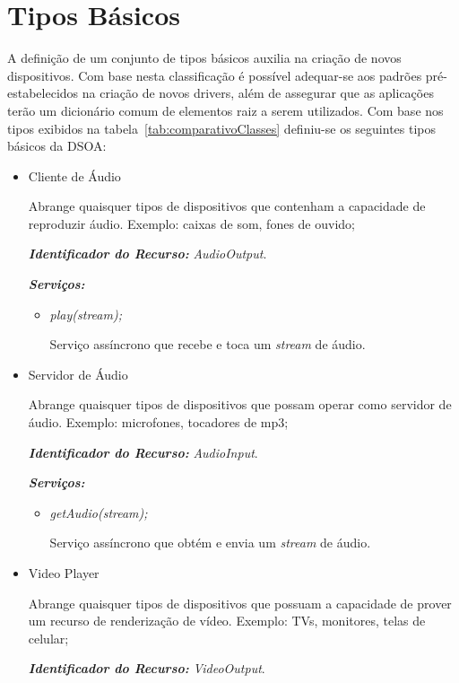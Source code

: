 \section{Tipos Básicos}
\label{sec:tiposBasicos}

A definição de um conjunto de tipos básicos auxilia na criação de novos dispositivos. Com base nesta classificação é possível adequar-se aos padrões pré-estabelecidos na criação de novos drivers, além de assegurar que as aplicações terão um dicionário comum de elementos raiz a serem utilizados. Com base nos tipos exibidos na tabela~\ref{tab:comparativoClasses} definiu-se os seguintes tipos básicos da DSOA:

\begin{itemize}
	\item Cliente de Áudio
		
		Abrange quaisquer tipos de dispositivos que contenham a capacidade de reproduzir áudio. Exemplo: caixas de som, fones de ouvido;

		\emph{\bf{Identificador do Recurso:}} \emph{AudioOutput}.

		\emph{\bf{Serviços:}}
		\begin{itemize}
			\item \emph{play(stream);}

				Serviço assíncrono que recebe e toca um \emph{stream} de áudio.
		\end{itemize}

	\item Servidor de Áudio
		
		Abrange quaisquer tipos de dispositivos que possam operar como servidor de áudio. Exemplo: microfones, tocadores de mp3;

		\emph{\bf{Identificador do Recurso:}} \emph{AudioInput}.

		\emph{\bf{Serviços:}} 
		\begin{itemize}
			\item \emph{getAudio(stream);}

				Serviço assíncrono que obtém e envia um \emph{stream} de áudio.
		\end{itemize}

	\item Video Player
		
		Abrange quaisquer tipos de dispositivos que possuam a capacidade de prover um recurso de renderização de vídeo. Exemplo: TVs, monitores, telas de celular;

		\emph{\bf{Identificador do Recurso:}} \emph{VideoOutput}.


\end{itemize}
